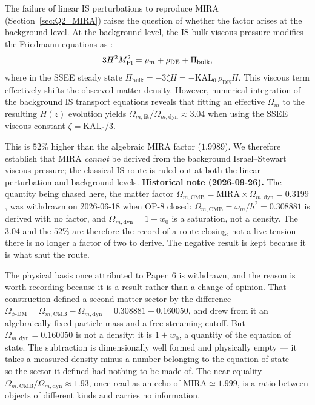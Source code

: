 \documentclass[12pt,a4paper]{article}
\newcommand{\KALz}{\mathrm{KAL}_0}
\begin{document}
The failure of linear IS perturbations to reproduce MIRA
(Section~\ref{sec:Q2_MIRA}) raises the question of whether the factor arises at the background level.
At the background level, the IS bulk viscous pressure modifies the Friedmann
equations as \citep{Zimdahl1996,Maartens1996}:
\begin{equation}
  3H^2 M_{\rm Pl}^2 = \rho_m + \rho_{\mathrm{DE}} + \Pi_{\mathrm{bulk}},
  \label{eq:Friedmann_IS}
\end{equation}
where in the SSEE steady state $\Pi_{\mathrm{bulk}} = -3\zeta H = -\KALz\,\rho_{\mathrm{DE}}H$.
This viscous term effectively shifts the observed matter density. However, numerical integration of the background IS transport equations reveals that fitting an effective $\Omega_m$ to the resulting $H(z)$ evolution yields $\Omega_{m,\mathrm{fit}} / \Omega_{m,\mathrm{dyn}} \approx 3.04$ when using the SSEE viscous constant $\zeta = \KALz/3$. 

This is $52\%$ higher than the algebraic MIRA factor ($1.9989$). We therefore establish that $\mathrm{MIRA}$ \emph{cannot} be derived from the background Israel--Stewart viscous pressure; the classical IS route is ruled out at both the linear-perturbation and background levels. \textbf{Historical note (2026-09-26).} The quantity being chased here, the matter factor $\Omega_{m,\mathrm{CMB}} = \mathrm{MIRA}\times\Omega_{m,\mathrm{dyn}}=0.3199$, was withdrawn on 2026-06-18 when OP-8 closed: $\Omega_{m,\mathrm{CMB}}=\omega_m/h^{2}=0.308881$ is derived with no factor, and $\Omega_{m,\mathrm{dyn}}=1+w_0$ is a saturation, not a density. The $3.04$ and the $52\%$ are therefore the record of a route closing, not a live tension --- there is no longer a factor of two to derive. The negative result is kept because it is what shut the route.

The physical basis once attributed to Paper~6 is withdrawn, and the reason is
worth recording because it is a result rather than a change of opinion.
That construction defined a second matter sector by the difference
$\Omega_{\phi\text{-DM}} = \Omega_{m,\mathrm{CMB}} - \Omega_{m,\mathrm{dyn}}
= 0.308881 - 0.160050$, and drew from it an algebraically fixed particle mass and
a free-streaming cutoff.  But $\Omega_{m,\mathrm{dyn}} = 0.160050$ is not a
density: it is $1+w_0$, a quantity of the equation of state.  The subtraction
is dimensionally well formed and physically empty --- it takes a measured
density minus a number belonging to the equation of state --- so the sector it
defined had nothing to be made of.  The near-equality
$\Omega_{m,\mathrm{CMB}}/\Omega_{m,\mathrm{dyn}} \approx 1.93$, once read as
an echo of $\mathrm{MIRA} \simeq 1.999$, is a ratio between objects of
different kinds and carries no information.
\end{document}

